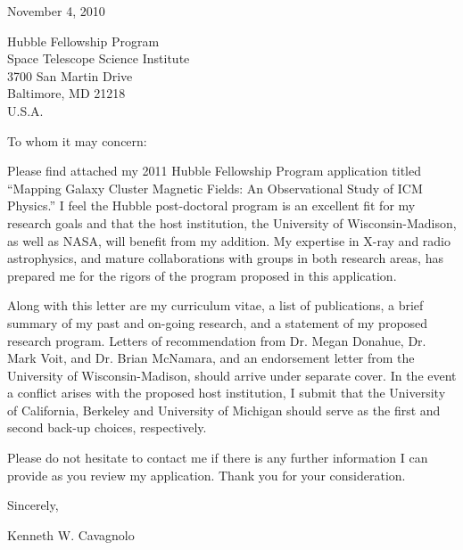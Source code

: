 \documentclass[letterpaper,12pt]{article}
\begin{document}
November 4, 2010

Hubble Fellowship Program\\
Space Telescope Science Institute\\
3700 San Martin Drive\\
Baltimore, MD 21218\\
U.S.A.

To whom it may concern:

Please find attached my 2011 Hubble Fellowship Program application
titled ``Mapping Galaxy Cluster Magnetic Fields: An Observational
Study of ICM Physics.'' I feel the Hubble post-doctoral program is an
excellent fit for my research goals and that the host institution, the
University of Wisconsin-Madison, as well as NASA, will benefit from my
addition. My expertise in X-ray and radio astrophysics, and mature
collaborations with groups in both research areas, has prepared me for
the rigors of the program proposed in this application.

Along with this letter are my curriculum vitae, a list of
publications, a brief summary of my past and on-going research, and a
statement of my proposed research program. Letters of recommendation
from Dr. Megan Donahue, Dr. Mark Voit, and Dr. Brian McNamara, and an
endorsement letter from the University of Wisconsin-Madison, should
arrive under separate cover. In the event a conflict arises with the
proposed host institution, I submit that the University of California,
Berkeley and University of Michigan should serve as the first and
second back-up choices, respectively.

Please do not hesitate to contact me if there is any further
information I can provide as you review my application. Thank you for
your consideration.

Sincerely,\\
\begin{minipage}{7.5in}
\end{minipage}
Kenneth W. Cavagnolo
\end{document}
